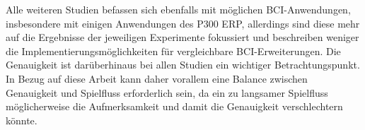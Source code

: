 Alle weiteren Studien befassen sich ebenfalls mit möglichen BCI-Anwendungen, insbesondere mit einigen Anwendungen des \acs{P300 ERP}, 
allerdings sind diese mehr auf die Ergebnisse der jeweiligen Experimente fokussiert und beschreiben weniger die Implementierungsmöglichkeiten für vergleichbare BCI-Erweiterungen.
Die Genauigkeit ist darüberhinaus bei allen Studien ein wichtiger Betrachtungspunkt. 
In Bezug auf diese Arbeit kann daher vorallem eine Balance zwischen Genauigkeit und Spielfluss erforderlich sein, 
da ein zu langsamer Spielfluss möglicherweise die Aufmerksamkeit und damit die Genauigkeit verschlechtern könnte.\\






















